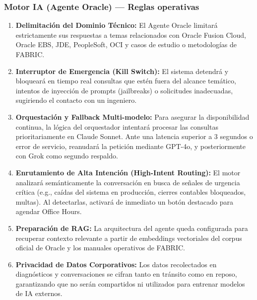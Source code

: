 \documentclass[11pt,letterpaper]{article}
\begin{document}
\subsubsection{Motor IA (Agente Oracle) — Reglas operativas}
\begin{enumerate}
\item \textbf{Delimitación del Dominio Técnico:} El Agente Oracle limitará estrictamente sus respuestas a temas relacionados con Oracle Fusion Cloud, Oracle EBS, JDE, PeopleSoft, OCI y casos de estudio o metodologías de FABRIC.
\item \textbf{Interruptor de Emergencia (Kill Switch):} El sistema detendrá y bloqueará en tiempo real consultas que estén fuera del alcance temático, intentos de inyección de prompts (jailbreaks) o solicitudes inadecuadas, sugiriendo el contacto con un ingeniero.
\item \textbf{Orquestación y Fallback Multi-modelo:} Para asegurar la disponibilidad continua, la lógica del orquestador intentará procesar las consultas prioritariamente en Claude Sonnet. Ante una latencia superior a 3 segundos o error de servicio, reanudará la petición mediante GPT-4o, y posteriormente con Grok como segundo respaldo.
\item \textbf{Enrutamiento de Alta Intención (High-Intent Routing):} El motor analizará semánticamente la conversación en busca de señales de urgencia crítica (e.g., caídas del sistema en producción, cierres contables bloqueados, multas). Al detectarlas, activará de inmediato un botón destacado para agendar Office Hours.
\item \textbf{Preparación de RAG:} La arquitectura del agente queda configurada para recuperar contexto relevante a partir de embeddings vectoriales del corpus oficial de Oracle y los manuales operativos de FABRIC.
\item \textbf{Privacidad de Datos Corporativos:} Los datos recolectados en diagnósticos y conversaciones se cifran tanto en tránsito como en reposo, garantizando que no serán compartidos ni utilizados para entrenar modelos de IA externos.
\end{enumerate}
\end{document}
